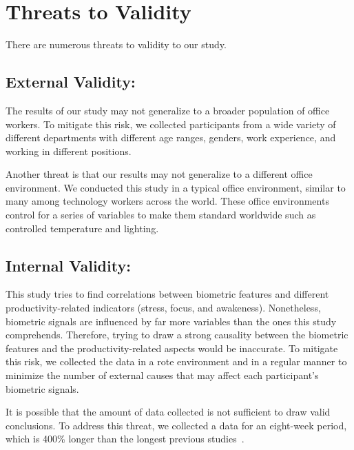 \section{Threats to Validity}
There are numerous threats to validity to our study.

\subsection{External Validity:}
The results of our study may 
 not generalize to a broader population of office workers.
To mitigate this risk, we collected participants
from a wide variety of different departments
with different age ranges, genders, work experience, and 
working in different positions.

Another threat is that our results may not generalize
to a different office environment. We conducted
this study in a typical office environment, similar to many
among technology workers across the world.
These office environments control for a series of
variables to make them standard worldwide such
as controlled temperature and lighting.

\subsection{Internal Validity:}
This study tries to find correlations between
biometric features and different productivity-related indicators (stress, focus, and awakeness).
Nonetheless, biometric signals are influenced by far more
variables than the ones this study comprehends.
Therefore, trying to draw a strong causality between the biometric
features and the productivity-related aspects would be inaccurate.
To mitigate this risk,  we collected the data
in a rote environment and in a regular manner 
to minimize the number of 
external causes that may affect each participant's
biometric signals.

It is possible that the amount of data collected
is not sufficient
to draw valid conclusions. To address this threat, 
we collected a data for an eight-week period, which is
400\% longer than the longest previous studies~\cite{zuger18,Muller16}.



